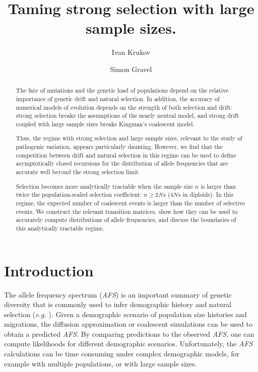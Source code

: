 \documentclass[review]{elsarticle}
\begin{document}
\begin{frontmatter}
  \title{ Taming strong selection with large sample sizes. }

  \author{Ivan Krukov}
  \author{Simon Gravel}

  \begin{abstract}
    The fate of mutations and the genetic load of populations depend on the relative importance of
    genetic drift and natural selection. In addition, the accuracy of numerical models of evolution
    depends on the strength of both selection and drift: strong selection breaks the assumptions of
    the nearly neutral model, and strong drift coupled with large sample sizes breaks
    Kingman's coalescent model.
  
    Thus, the regime with strong selection and large sample sizes, relevant 
    to the study of pathogenic variation, appears particularly daunting.
    However, we find that the competition between drift and natural selection in this regime can be
    used to define asymptotically closed recursions for the distribution of allele
    frequencies that are accurate well beyond the strong selection limit.
 
    Selection becomes more analytically tractable when the sample size $n$ is larger than twice the
    population-scaled selection coefficient: $n \ge 2Ns$ ($4Ns$ in diploids). In this regime, the
    expected number of coalescent events is larger than the number of selective events. 
    We construct the relevant transition matrices, show how they can be used to accurately compute
    distributions of allele frequencies, and discuss the boundaries of this analytically tractable
    regime. 
  \end{abstract}

\end{frontmatter}

\section{Introduction}
\label{sec_introduciton}

The allele frequency spectrum (\textit{AFS}) is an important summary of genetic diversity that is
commonly used to infer demographic history and natural selection (\textit{e.g.}
\cite{GutenkunstEtAl2009, KammEtAl2017, JouganousEtAl2017}). Given a demographic scenario of
population size histories and migrations, the diffusion approximation or coalescent simulations can
be used to obtain a predicted \textit{AFS}. By comparing predictions to the observed \textit{AFS},
one can compute likelihoods for different demographic scenarios. Unfortunately, the \textit{AFS}
calculations can be time consuming under complex demographic models, for example with multiple
populations, or with large sample sizes.
\end{document}
